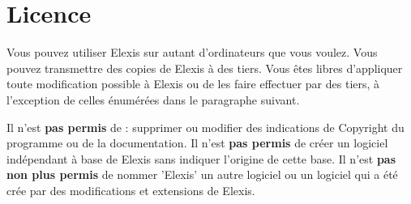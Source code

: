\documentclass[paper=a4,BCOR8.25mm,twoside]{scrbook}
\begin{document}
\section{Licence}
Vous pouvez utiliser Elexis sur autant d'ordinateurs que vous voulez. Vous pouvez transmettre des copies de Elexis à des tiers. Vous êtes libres d'appliquer toute modification possible à Elexis ou de les faire effectuer par des tiers, à l'exception de celles énumérées dans le paragraphe suivant.


\medskip

Il n'est  \textbf{pas permis }de : supprimer ou modifier des indications de Copyright du programme ou de la documentation. Il n'est  \textbf{pas permis} de créer un logiciel indépendant à base de Elexis sans indiquer l'origine de cette base. Il n'est \textbf{pas non plus permis} de nommer 'Elexis' un autre logiciel ou un logiciel qui a été crée par des modifications et extensions de Elexis.
\end{document}

